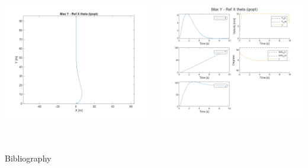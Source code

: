 \documentclass[aspectratio=169]{beamer}
\begin{document}
\begin{frame}
\begin{columns}
\begin{column}{0.25\textwidth}
			\includegraphics[width = \columnwidth]{figs/Max_Y_-_Ref_X_theta_(ipopt)_quiver.png}
		\end{column}
		\begin{column}{0.4\textwidth}
			\includegraphics[width = \columnwidth]{figs/Max_Y_-_Ref_X_theta_(ipopt)_traj.png}			
		\end{column}
	\end{columns}
\end{frame}




	




\section*{}




\begin{frame}[allowframebreaks]{Bibliography}
	
	
\end{frame}
\end{document}
